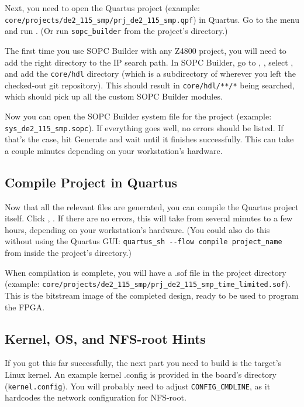 Next, you need to open the Quartus project (example:
\verb+core/projects/de2_115_smp/prj_de2_115_smp.qpf+) in Quartus. Go to the
 menu and run . (Or run \verb+sopc_builder+
from the project's directory.)

The first time you use SOPC Builder with any Z4800 project, you will need to
add the right directory to the IP search path. In SOPC Builder, go to
, , select , and add the
\verb+core/hdl+ directory (which is a subdirectory of wherever you left the
checked-out git repository). This should result in \verb+core/hdl/**/*+ being
searched, which should pick up all the custom SOPC Builder modules.

Now you can open the SOPC Builder system file for the project (example:
\verb+sys_de2_115_smp.sopc+). If everything goes well, no errors should be
listed. If that's the case, hit Generate and wait until it finishes
successfully. This can take a couple minutes depending on your workstation's
hardware.

\subsection{Compile Project in Quartus}

Now that all the relevant files are generated, you can compile the Quartus
project itself. Click , . If there
are no errors, this will take from several minutes to a few hours, depending on
your workstation's hardware. (You could also do this without using the Quartus
GUI: \verb+quartus_sh --flow compile project_name+ from inside the project's
directory.)

When compilation is complete, you will have a .sof file in the project
directory (example:
\verb+core/projects/de2_115_smp/prj_de2_115_smp_time_limited.sof+). This is the
bitstream image of the completed design, ready to be used to program the FPGA.

\subsection{Kernel, OS, and NFS-root Hints}

If you got this far successfully, the next part you need to build is the
target's Linux kernel. An example kernel .config is provided in the board's
directory (\verb+kernel.config+). You will probably need to adjust
\verb+CONFIG_CMDLINE+, as it hardcodes the network configuration for NFS-root.


